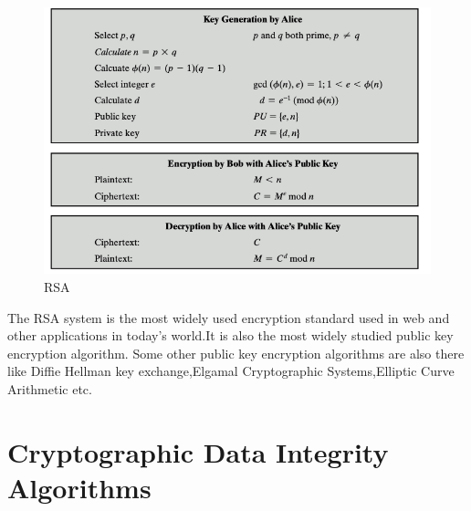 \documentclass{article}
\begin{document}
\\
\begin{figure}
\begin{center}
    
    \includegraphics[scale = 0.5]{images/RSA.png}
    \caption{RSA}

\end{center}
 \end{figure}
The RSA system is the most widely used encryption standard used in web and other applications in today's world.It is also the most widely studied public key encryption algorithm. Some other public key encryption algorithms are also there like Diffie Hellman key exchange,Elgamal Cryptographic Systems,Elliptic Curve Arithmetic etc.

\section{Cryptographic Data Integrity Algorithms}
\end{document}
